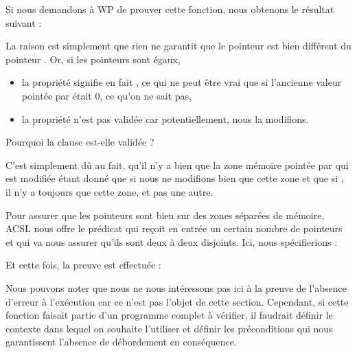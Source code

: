 


Si nous demandons à WP de prouver cette fonction, nous obtenons le 
résultat suivant :





La raison est simplement que rien ne garantit que le pointeur  est bien
différent du pointeur . Or, si les pointeurs sont égaux,



\begin{itemize}
\item la propriété  signifie en fait 
, ce qui ne peut être vrai que si l'ancienne valeur 
pointée par  était 0, ce qu'on ne sait pas,
\item la propriété  n'est pas validée car potentiellement,
nous la modifions.
\end{itemize}


\begin{Question}
Pourquoi la clause  est-elle validée ?

C'est simplement dû au fait, qu'il n'y a bien que la zone mémoire pointée par
 qui est modifiée étant donné que si  nous ne modifions bien 
que cette zone et que si , il n'y a toujours que cette zone, et 
pas une autre.
\end{Question}


Pour assurer que les pointeurs sont bien sur des zones séparées de mémoire, 
ACSL nous offre le prédicat  qui reçoit en entrée 
un certain nombre de pointeurs et qui va nous assurer qu'ils sont deux à deux 
disjoints. Ici, nous spécifierions :






Et cette fois, la preuve est effectuée :





Nous pouvons noter que nous ne nous intéressons pas ici à la preuve de 
l'absence d'erreur à l'exécution car ce n'est pas l'objet de cette section.
Cependant, si cette fonction faisait partie d'un programme complet à vérifier,
il faudrait définir le contexte dans lequel on souhaite l'utiliser et définir
les préconditions qui nous garantissent l'absence de débordement en conséquence.


